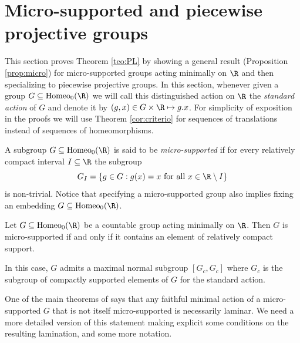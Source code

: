 \documentclass[reqno]{amsart}
\begin{document}
\section{Micro-supported and piecewise projective groups} \label{subsection:micro}
This section proves Theorem \ref{teo:PL} by showing a general result (Proposition \ref{prop:micro}) for micro-supported groups acting minimally on $\R$ and then specializing to piecewise projective groups. In this section, whenever given a group $G \subseteq \mathrm{Homeo}_0(\R)$ we will call this distinguished action on $\R$ the \emph{standard action} of $G$ and denote it by $(g,x) \in G \times \R \mapsto g.x$. For simplicity of exposition in the proofs we will use Theorem \ref{cor:criterio} for sequences of translations instead of sequences of homeomorphisms.

A subgroup $G \subseteq \mathrm{Homeo}_0(\R)$ is said to be \emph{micro-supported} if for every relatively compact interval $I \subseteq \R$ the subgroup
\[
	G_I = \{g \in G : g(x) = x \text{ for all }x \in \R \setminus I \}
\]
is non-trivial. Notice that specifying a micro-supported group also implies fixing an embedding $G \subseteq \mathrm{Homeo}_0(\R)$.

\begin{prop} \label{prop:BMRTmicro}
Let $G \subseteq \mathrm{Homeo}_0(\R)$ be a countable group acting minimally on $\R$. Then $G$ is micro-supported if and only if it contains an element of relatively compact support.

In this case, $G$ admits a maximal normal subgroup $[G_c, G_c]$ where $G_c$ is the subgroup of compactly supported elements of $G$ for the standard action.
\end{prop}

One of the main theorems of \cite{BMRT} says that any faithful minimal action of a micro-supported $G$ that is not itself micro-supported is necessarily laminar. We need a more detailed version of this statement making explicit some conditions on the resulting lamination, and some more notation.
\end{document}
